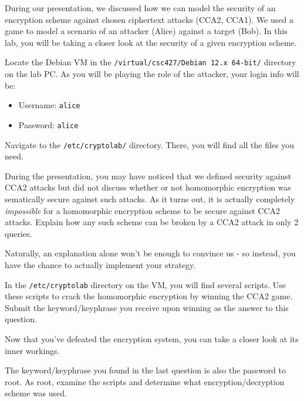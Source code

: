 \documentclass{article}
\begin{document}

During our presentation, we discussed how we can model the security of an encryption scheme against
chosen ciphertext attacks (CCA2, CCA1). We used a game to model a scenario of an attacker (Alice)
against a target (Bob). In this lab, you will be taking a closer look at the security of a given
encryption scheme.

Locate the Debian VM in the \texttt{/virtual/csc427/Debian 12.x 64-bit/} directory on the lab PC.
As you will be playing the role of the attacker, your login info will be:
\begin{itemize}
    \item Username: \texttt{alice}
    \item Password: \texttt{alice}
\end{itemize}
Navigate to the \texttt{/etc/cryptolab/} directory. There, you will find all the files you need.

\setcounter{subsection}{1}
\begin{qu}
    During the presentation, you may have noticed that we defined security against CCA2 attacks
    but did not discuss whether or not homomorphic encryption was sematically secure against such
    attacks. As it turns out, it is actually completely \textit{impossible} for a homomorphic
    encryption scheme to be secure against CCA2 attacks. \vsp
    Explain how any such scheme can be broken by a CCA2 attack in only 2 queries.
\end{qu}

Naturally, an explanation alone won't be enough to convince us - so instead, you have the chance to
actually implement your strategy.

\begin{qu}
    In the \texttt{/etc/cryptolab} directory on the VM, you will find several scripts. Use these
    scripts to crack the homomorphic encryption by winning the CCA2 game. \vsp
    Submit the keyword/keyphrase you receive upon winning as the answer to this question.
\end{qu}

Now that you've defeated the encryption system, you can take a closer look at its inner workings.

\begin{qu}
    The keyword/keyphrase you found in the last question is also the password to root.
    As root, examine the scripts and determine what encryption/decryption scheme was used.
\end{qu}
\end{document}
